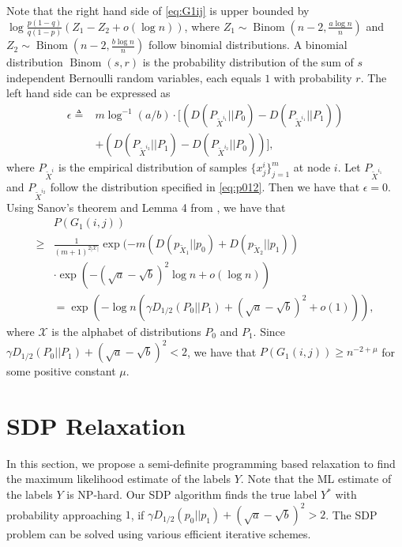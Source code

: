 \documentclass[conference]{IEEEtran}
\DeclareMathOperator{\Binom}{Binom}
\begin{document}
		Note that the right hand side of \eqref{eq:G1ij} is upper bounded by $\log \frac{p(1-q)}{q(1-p)}(Z_1-Z_2+o(\log n))$, where $Z_1\sim \Binom(n-2,\frac{a\log n}{n})$ and $Z_2\sim \Binom(n-2,\frac{b\log n}{n})$ 
		follow binomial distributions. A binomial distribution $\Binom(s,r)$ is the probability distribution of the sum of $s$ independent Bernoulli random variables, each equals $1$ with probability $r$.
		The left hand side can be expressed as
		\begin{align*}
			\epsilon\triangleq&m\log^{-1}( a /b)\cdot [(D(P_{\widetilde{X}^{i_1}} || P_0) - D(P_{\widetilde{X}^{i_1}} || P_1)) \\
			&+(D(P_{\widetilde{X}^{i_2}} || P_1) - D(P_{\widetilde{X}^{i_2}} || P_0))],
		\end{align*}
		where $P_{\widetilde{X}^i}$ is the empirical distribution of samples $\{x^i_j\}^m_{j=1}$ at node $i$. Let $P_{\widetilde{X}^{i_1}}$ and $P_{\widetilde{X}^{i_2}}$ follow the distribution specified in \eqref{eq:p012}. Then we have that $\epsilon =0$. Using Sanov's theorem and Lemma 4 from \cite{abbe2015exact}, we have that
		\begin{align*}
			&P(G_1(i,j))\\
			\geq &\frac{1}{(m+1)^{2|\mathcal{X}|}} \exp(-m(D(p_{\widetilde{X}_1} || p_0) + D(p_{\widetilde{X}_2} || p_1)) \\
			&\cdot\exp(- (\sqrt{a} - \sqrt{b})^2\log n+o(\log n) ) \\
			& = \exp(-\log n (\gamma D_{1/2}(P_0||P_1) + (\sqrt{a} - \sqrt{b})^2+ o(1))),
		\end{align*}
		where $\mathcal{X}$ is the alphabet of distributions $P_0$ and $P_1$.
		Since $\gamma D_{1/2}(P_0||P_1) + (\sqrt{a} - \sqrt{b})^2<2$, we have that $P(G_1(i,j))\ge n^{-2+\mu}$ for some positive constant $\mu$.
	

	
	\section{SDP Relaxation}\label{s:sdp}
	In this section, we propose a semi-definite programming based relaxation to find the maximum likelihood estimate of the labels $Y$. Note that
	the ML estimate of the labels $Y$ is NP-hard. 
	Our SDP algorithm finds the true label $Y^*$ with probability approaching $1$, if
	$\gamma D_{1/2}(p_0||p_1) + (\sqrt{a} - \sqrt{b})^2 > 2$.
	The SDP problem can be solved using various efficient iterative schemes.
	
\end{document}
